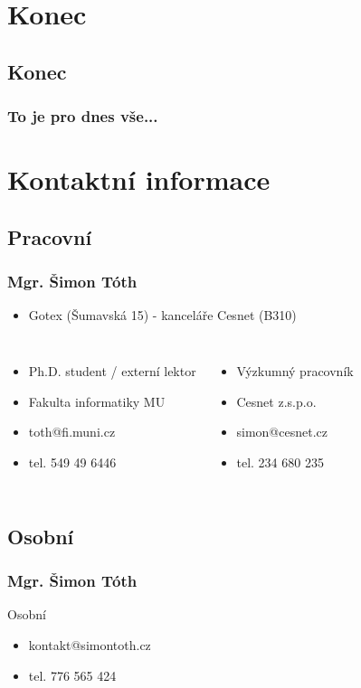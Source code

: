 \section{Konec}
\subsection{Konec}

\begin{frame}
	\frametitle{To je pro dnes vše...}
\end{frame}

\section{Kontaktní informace}
	\subsection{Pracovní}

\begin{frame}[label=kontakt-simontoth]
	\frametitle{Mgr. Šimon Tóth}
	\begin{itemize}
		\item{Gotex (Šumavská 15) - kanceláře Cesnet (B310)}
	\end{itemize}
	
	\begin{center}
	\begin{columns}

		\begin{itemize}
			\item{Ph.D. student / externí lektor}
			\item{Fakulta informatiky MU}
			\item{toth@fi.muni.cz}
			\item{tel. 549 49 6446}
		\end{itemize}

		\begin{itemize}
			\item{Výzkumný pracovník}
			\item{Cesnet z.s.p.o.}
			\item{simon@cesnet.cz}
			\item{tel. 234 680 235}
		\end{itemize}

	\end{columns}
	\end{center}

\end{frame}

	\subsection{Osobní}

\begin{frame}
	\frametitle{Mgr. Šimon Tóth}
		Osobní
		\begin{itemize}
			\item{kontakt@simontoth.cz}
			\item{tel. 776 565 424}
		\end{itemize}
\end{frame}



